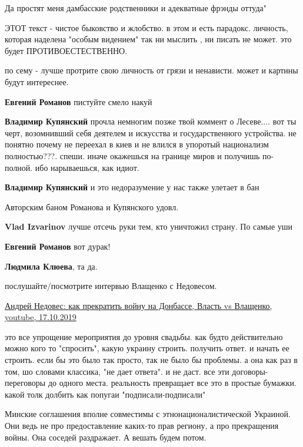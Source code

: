\begin{itemize}
\begin{itemize}
Да простят меня дамбасские родственники и адекватные фрэнды оттуда"

ЭТОТ текст - чистое быковство и жлобство. в этом и есть парадокс. личность,
которая наделена "особым видением" так ни мыслить , ни писать не может. это
будет ПРОТИВОЕСТЕСТВЕННО.

по сему - лучше протрите свою личность от грязи и ненависти. может и картины
будут интереснее.

\textbf{Евгений Романов} пистуйте смело накуй

\textbf{Владимир Купянский} прочла немногим позже твой коммент о Лесеве.... вот ты черт, возомнивший себя деятелем и искусства и государственного устройства.
не понятно почему не переехал в киев и не влился в упоротый национализм полностью???.
спеши. иначе окажешься на границе миров и получишь по-полной. ибо нарываешься, как идиот.

\textbf{Владимир Купянский} и это недоразумение у нас также улетает в бан

Авторским баном Романова и Купянского удовл.

\textbf{Vlad Izvarinov} лучше отсечь руки тем, кто уничтожил страну. По самые уши

\textbf{Евгений Романов} вот дурак!

\textbf{Людмила Клюева}, та да.

послушайте/посмотрите интервью Влащенко с Недовесом.

\href{https://www.youtube.com/watch?v=6S-Syu1cGHo}{%
Андрей Недовес: как прекратить войну на Донбассе, Власть vs Влащенко, youtube, 17.10.2019%
}

\end{itemize} %


это все упрощение мероприятия до уровня свадьбы. как будто действительно можно
кого то "спросить", какую украину строить. получить ответ. и начать ее строить.
если бы это было так просто, так не было бы проблемы. а она как раз в том, шо
словами классика, "не дает ответа". и не даст. все эти договоры-переговоры до
одного места. реальность превращает все это в простые бумажки. какой толк
долбить как попугаи "подписали-подписали"


Минские соглашения вполне совместимы с этнонационалистической Украиной. Они
ведь не про предоставление каких-то прав региону, а про прекращения войны. Она
соседей раздражает. А вешать будем потом.


\end{itemize}
